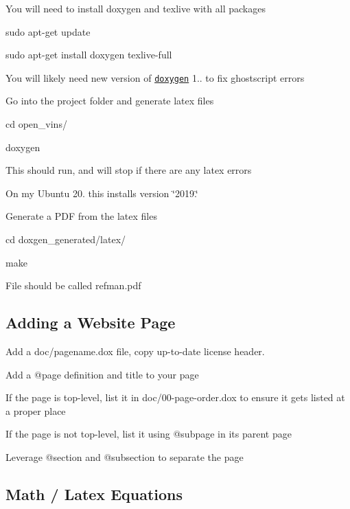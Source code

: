 \begin{DoxyEnumerate}
\item You will need to install doxygen and texlive with all packages
\begin{DoxyItemize}
\item {\ttfamily sudo apt-\/get update}
\item {\ttfamily sudo apt-\/get install doxygen texlive-\/full}
\item You will likely need new version of \href{https://stackoverflow.com/a/50986638/7718197}{\tt doxygen} 1.. to fix ghostscript errors
\end{DoxyItemize}
\item Go into the project folder and generate latex files
\begin{DoxyItemize}
\item {\ttfamily cd open\+\_\+vins/}
\item {\ttfamily doxygen}
\item This should run, and will stop if there are any latex errors
\item On my Ubuntu 20. this installs version \char`\"{}2019.\char`\"{}
\end{DoxyItemize}
\item Generate a P\+DF from the latex files
\begin{DoxyItemize}
\item {\ttfamily cd doxgen\+\_\+generated/latex/}
\item {\ttfamily make}
\item File should be called {\ttfamily refman.\+pdf}
\end{DoxyItemize}
\end{DoxyEnumerate}\hypertarget{dev-docs_developers-addpage}{}\subsection{Adding a Website Page}\label{dev-docs_developers-addpage}

\begin{DoxyEnumerate}
\item Add a {\ttfamily doc/pagename.\+dox} file, copy up-\/to-\/date license header.
\item Add a {\ttfamily @page} definition and title to your page
\item If the page is top-\/level, list it in {\ttfamily doc/00-\/page-\/order.\+dox} to ensure it gets listed at a proper place
\item If the page is not top-\/level, list it using {\ttfamily @subpage} in its parent page
\item Leverage {\ttfamily @section} and {\ttfamily @subsection} to separate the page
\end{DoxyEnumerate}\hypertarget{dev-docs_latex}{}\subsection{Math / Latex Equations}\label{dev-docs_latex}

